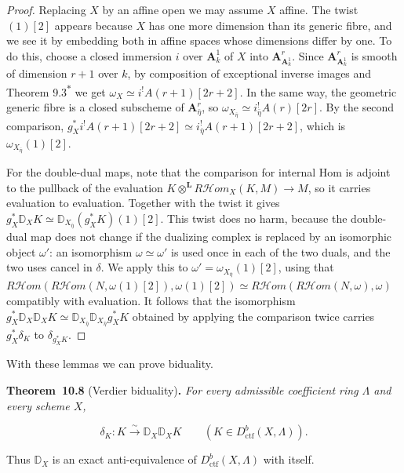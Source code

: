 \documentclass[11pt]{article}
\newenvironment{bpstatement}[2]{\par\addvspace{0.6\baselineskip}\noindent\textbf{#1}#2\textbf{.}\enspace\ignorespaces}
  {\par\addvspace{0.4\baselineskip}}
\newenvironment{bpstatementit}[2]{\begin{bpstatement}{#1}{#2}\itshape\ignorespaces}{\end{bpstatement}}
\newcommand{\bpout}[1]{#1\textsuperscript{\hyperlink{bp-outside}{\ensuremath{\ast}}}}
\providecommand{\cHom}{}\renewcommand{\cHom}{R\mathcal{H}\!om}
\begin{document}
\begin{proof}[{Proof}]\label{bp23}%
Replacing \(X\) by an affine open we may assume \(X\) affine. The twist \((1)[2]\) appears because \(X\) has one more dimension than its generic fibre, and we see it by embedding both in affine spaces whose dimensions differ by one. To do this, choose a closed immersion \(i\) over \(\mathbf A^1_k\) of \(X\) into \(\mathbf A^r_{\mathbf A^1_k}\). Since \(\mathbf A^r_{\mathbf A^1_k}\) is smooth of dimension \(r+1\) over \(k\), by composition of exceptional inverse images and Theorem \bpout{9.3} we get \(\omega_X\simeq i^!A(r+1)[2r+2]\). In the same way, the geometric generic fibre is a closed subscheme of \(\mathbf A^r_{\bar\eta}\), so \(\omega_{X_{\bar\eta}}\simeq i_{\bar\eta}^!A(r)[2r]\). By the second comparison, \(g_X^*i^!A(r+1)[2r+2]\simeq i_{\bar\eta}^!A(r+1)[2r+2]\), which is \(\omega_{X_{\bar\eta}}(1)[2]\).

For the double-dual maps, note that the comparison for internal Hom is adjoint to the pullback of the evaluation \(K\otimes^{\mathbf L}\cHom_X(K,M)\to M\), so it carries evaluation to evaluation. Together with the twist it gives \(g_X^*\mathbb D_XK\simeq\mathbb D_{X_{\bar\eta}}(g_X^*K)(1)[2]\). This twist does no harm, because the double-dual map does not change if the dualizing complex is replaced by an isomorphic object \(\omega'\): an isomorphism \(\omega\simeq\omega'\) is used once in each of the two duals, and the two uses cancel in \(\delta\). We apply this to \(\omega'=\omega_{X_{\bar\eta}}(1)[2]\), using that \(\cHom(\cHom(N,\omega(1)[2]),\omega(1)[2])\simeq\cHom(\cHom(N,\omega),\omega)\) compatibly with evaluation. It follows that the isomorphism \(g_X^*\mathbb D_X\mathbb D_XK\simeq\mathbb D_{X_{\bar\eta}}
\mathbb D_{X_{\bar\eta}}g_X^*K\) obtained by applying the comparison twice carries \(g_X^*\delta_K\) to \(\delta_{g_X^*K}\).
\end{proof}

\label{bp24}%
With these lemmas we can prove biduality.

\label{bp25}%
\begin{bpstatementit}{Theorem~10.8}{ (Verdier biduality)}
For every admissible coefficient ring \(\Lambda\) and every scheme \(X\),

\[
\delta_K:K\xrightarrow{\sim}\mathbb D_X\mathbb D_XK
\qquad(K\in D^b_{\mathrm{ctf}}(X,\Lambda)).
\]

Thus \(\mathbb D_X\) is an exact anti-equivalence of \(D^b_{\mathrm{ctf}}(X,\Lambda)\) with itself.
\end{bpstatementit}
\end{document}
